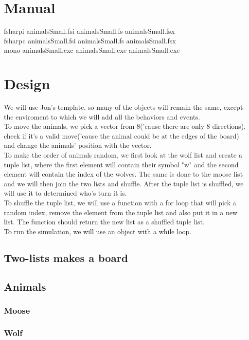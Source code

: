 \documentclass{article}
\begin{document}
    \section{Manual}
   		fsharpi animalsSmall.fsi animalsSmall.fs animalsSmall.fsx
   		\\
   		fsharpc animalsSmall.fsi animalsSmall.fs animalsSmall.fsx
    	\\
    	mono animalsSmall.exe animalsSmall.exe animalsSmall.exe
    \section{Design}
    	We will use Jon's template, so many of the objects will remain the same, except the enviroment to which we will add all the behaviors and events.
    	\\
    	To move the animals, we pick a vector from 8('cause there are only 8 directions), check if it's a valid move('cause  the animal could be at the edges of the board) and change the animals' position with the vector.
    	\\
    	To make the order of animals random, we first look at the wolf list and create a tuple list, where the first element will contain their symbol "w" and the second element will contain the index of the wolves. The same is done to the moose list and we will then join the two lists and shuffle. After the tuple list is shuffled, we will use it to determined who's turn it is.
    	\\
    	To shuffle the tuple list, we will use a function with a for loop that will pick a random index, remove the element from the tuple list and also put it in a new list. The function should return the new list as a shuffled tuple list.
    	\\
    	To run the simulation, we will use an object with a while loop.
    \subsection{Two-lists makes a board}
    \subsection{Animals}
    \subsubsection{Moose}
    \subsubsection{Wolf}    
\end{document}
